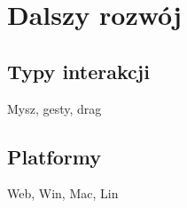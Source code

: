 \section{Dalszy rozwój}
\subsection{Typy interakcji}
Mysz, gesty, drag

\subsection{Platformy}
Web, Win, Mac, Lin 
